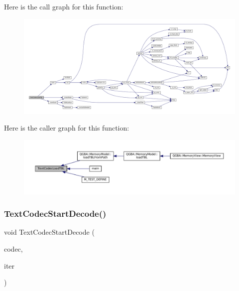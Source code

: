 Here is the call graph for this function\+:
\nopagebreak
\begin{figure}[H]
\begin{center}
\leavevmode
\includegraphics[width=350pt]{text-codec_8c_a64c21801885c3ff4c5d2d8c5377c1cd5_cgraph}
\end{center}
\end{figure}
Here is the caller graph for this function\+:
\nopagebreak
\begin{figure}[H]
\begin{center}
\leavevmode
\includegraphics[width=350pt]{text-codec_8c_a64c21801885c3ff4c5d2d8c5377c1cd5_icgraph}
\end{center}
\end{figure}
\mbox{\label{text-codec_8c_a8a637ebd50ab6b36d4eb5a4c2a9bf55b}} 
\subsubsection{\texorpdfstring{Text\+Codec\+Start\+Decode()}{TextCodecStartDecode()}}
{\footnotesize\ttfamily void Text\+Codec\+Start\+Decode (\begin{DoxyParamCaption}\item[{struct Text\+Codec $\ast$}]{codec,  }\item[{struct Text\+Codec\+Iterator $\ast$}]{iter }\end{DoxyParamCaption})}

